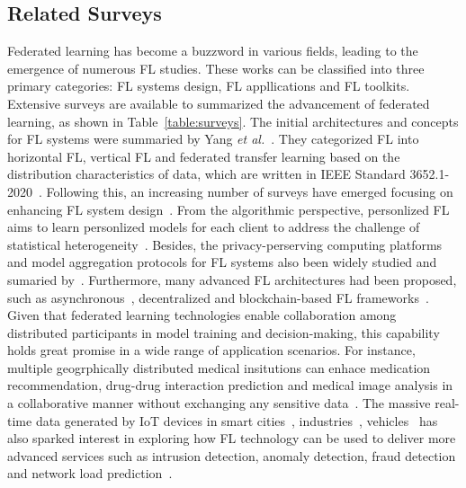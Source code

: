 \subsection{Related Surveys}
Federated learning has become a buzzword in various fields, leading to the emergence of numerous FL studies.
These works can be classified into three primary categories: FL systems design, FL appllications and FL toolkits. Extensive surveys are available to summarized the advancement of federated learning, as shown in Table~\ref{table:surveys}.
The initial architectures and concepts for FL systems were summaried by Yang \textit{et al.}~\cite{yang2019federated}. 
They categorized FL into horizontal FL, vertical FL and federated transfer learning based on the distribution characteristics of data, 
which are written in IEEE Standard 3652.1-2020~\cite{yang2021white, IEEEstd3652}. 
Following this, an increasing number of surveys have emerged focusing on enhancing FL system design~\cite{li2020federated,aledhari2020federated, kairouz2021advances, zhang2021survey, li2021survey}. 
From the algorithmic perspective, personlized FL~\cite{kulkarni2020survey, tan2022towards} aims to learn personlized models for each client to address the challenge of statistical heterogeneity~\cite{ma2022state}.
Besides, the privacy-perserving computing platforms and model aggregation protocols for FL systems also been widely studied and sumaried by~\cite{liu2022privacy,el2022differential,yin2021comprehensive,lyu2020threats}.
Furthermore, many advanced FL architectures had been proposed, such as asynchronous~\cite{xu2021asynchronous}, decentralized and blockchain-based FL frameworks~\cite{nguyen2021federated, qu2022blockchain, zhu2022blockchain}.
Given that federated learning technologies enable collaboration among distributed participants in model training and decision-making, this capability holds great promise in a wide range of application scenarios.
For instance, multiple geogrphically distributed medical insitutions can enhace medication recommendation, drug-drug interaction prediction and medical image analysis in a collaborative manner without exchanging any sensitive data~\cite{xu2021federated, pfitzner2021federated, antunes2022federated, rieke2020future}. 
The massive real-time data generated by IoT devices in smart cities~\cite{zhang2022federated, ramu2022federated}, industries~\cite{boopalan2022fusion}, vehicles~\cite{du2020federated} has also sparked interest in exploring how FL technology can be used to deliver more advanced services such as intrusion detection, anomaly detection, fraud detection and network load prediction~\cite{agrawal2022federated, alazab2021federated, ghimire2022recent}.

